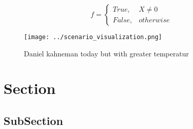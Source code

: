 \documentclass[a4paper]{article}
\begin{document}
\begin{equation}   f =
\begin{cases} True, & X \neq 0\\
False, & otherwise
\end{cases}
\end{equation}

\begin{figure}
\centering
\texttt{[image: ../scenario\_visualization.png]}
\caption{Daniel kahneman today but with greater temperatur
}
\end{figure}
 
\section{Section}

\subsection{SubSection}
\end{document}
